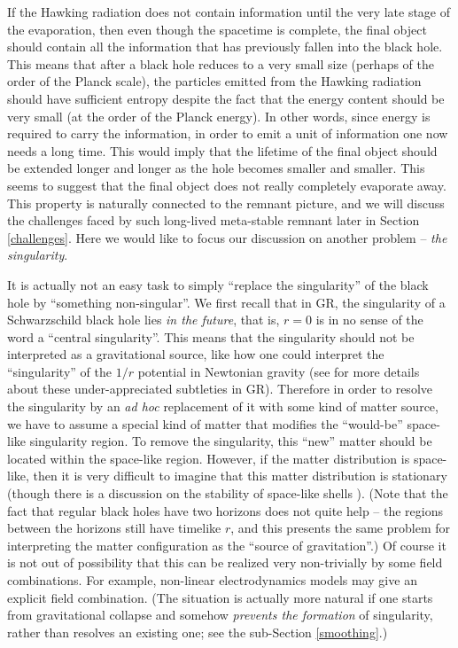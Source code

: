 \documentclass[12pt]{article}
\newcommand{\2}{$^2$}
\newcommand{\3}{$^3$}
\newcommand{\4}{$_4$}
\newcommand{\5}{$_5$}
\begin{document}
If the Hawking radiation does not contain information until the very late stage of the evaporation, then even though the spacetime is complete, the final object should contain all the information that has previously fallen into the black hole.
This means that after a black hole reduces to a very small size (perhaps of the order of the Planck scale), the particles emitted from the Hawking radiation should have sufficient entropy despite the fact that the energy content should be very small (at the order of the Planck energy). In other words, since energy is required to carry the information, in order to emit a unit of information one now needs a long time. This would imply that the lifetime of the final object should be extended longer and longer as the hole becomes smaller and smaller. This seems to suggest that the final object does not really completely evaporate away. This property is naturally connected to the remnant picture, and we will discuss the challenges faced by such long-lived meta-stable remnant later in Section \ref{challenges}. Here we would like to focus our discussion on another problem -- \emph{the singularity}.



It is actually not an easy task to simply ``replace the singularity'' of the black hole by ``something non-singular''. 
We first recall that in GR, the singularity of a Schwarzschild black hole lies \emph{in the future}, that is, $r=0$ is in no sense of the word a ``central singularity''. This means that the singularity should not be interpreted as a gravitational source, like how one could interpret the ``singularity'' of the $1/r$ potential in Newtonian gravity (see \cite{mcinnesessay} for more details about these under-appreciated subtleties in GR).
Therefore in order to resolve the singularity by an \emph{ad hoc} replacement of it with some kind of matter source, we have to assume a special kind of matter that modifies the ``would-be'' space-like singularity region. To remove the singularity, this ``new'' matter should be located within the space-like region. However, if the matter distribution is space-like, then it is very difficult to imagine that this matter distribution is stationary (though there is a discussion on the stability of space-like shells \cite{Balbinot:1990zz}). (Note that the fact that regular black holes have two horizons does not quite help -- the regions between the horizons still have timelike $r$, and this presents the same problem for interpreting the matter configuration as the ``source of gravitation''.) Of course it is not out of possibility that this can be realized very non-trivially by some field combinations. For example, non-linear electrodynamics models \cite{AyonBeato:1999rg} may give an explicit field combination. (The situation is actually more natural if one starts from gravitational collapse and somehow \emph{prevents the formation} of singularity, rather than resolves an existing one; see the sub-Section \ref{smoothing}.) 
\end{document}
